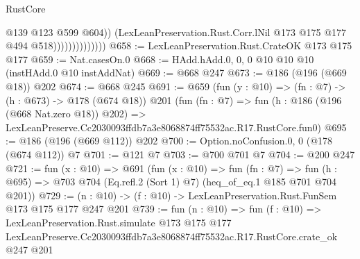\begin{lexlean}{RustCore}
\begin{coremodule}
                                  @139
                                  @123
                                  @599
                                  @604))
                              (LexLeanPreservation.Rust.Corr.lNil
                                @173
                                @175
                                @177
                                @494
                                @518))))))))))))))
@658 := LexLeanPreservation.Rust.CrateOK @173 @175 @177
@659 := Nat.casesOn.{0}
@668 := HAdd.hAdd.{0, 0, 0} @10 @10 @10 (instHAdd.{0} @10 instAddNat)
@669 := @668 @247
@673 := @186 (@196 (@669 @18)) @202
@674 := @668 @245
@691 := @659
    (fun (y : @10) => (fn : @7) -> (h : @673) -> @178 (@674 @18))
    @201
    (fun (fn : @7) =>
    fun (h : @186 (@196 (@668 Nat.zero @18)) @202) =>
    LexLeanPreserve.Cc2030093ffdb7a3e8068874ff75532ac.R17.RustCore.fun0)
@695 := @186 (@196 (@669 @112)) @202
@700 := Option.noConfusion.{0, 0} (@178 (@674 @112)) @7
@701 := @121 @7
@703 := @700 @701 @7
@704 := @200 @247
@721 := fun (x : @10) =>
  @691
    (fun (x : @10) =>
    fun (fn : @7) =>
    fun (h : @695) => @703 @704 (Eq.refl.{2} (Sort 1) @7) (heq_of_eq.{1} @185 @701 @704 @201))
@729 := (n : @10) -> (f : @10) -> LexLeanPreservation.Rust.FunSem @173 @175 @177 @247 @201
@739 := fun (n : @10) =>
  fun (f : @10) =>
  LexLeanPreservation.Rust.simulate
    @173
    @175
    @177
    LexLeanPreserve.Cc2030093ffdb7a3e8068874ff75532ac.R17.RustCore.crate_ok
    @247
    @201
\end{coremodule}
\end{lexlean}
